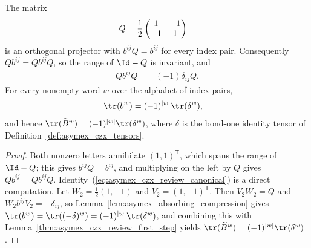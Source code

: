 \begin{lemma}
    \label{thm:asymex_czx_review_canonical_form}
    \leanok
    The matrix
    \begin{align}
        Q & =\frac12\begin{pmatrix}1&-1\\-1&1\end{pmatrix}
        \notag
    \end{align}
    is an orthogonal projector with $b^{ij}Q=b^{ij}$ for every index pair.
    Consequently $Qb^{ij}=Qb^{ij}Q$, so the range of $\Id-Q$ is invariant,
    and
    \begin{align}
        Qb^{ij}Q & =(-1)\delta_{ij}Q.
        \label{eq:asymex_czx_review_canonical}
    \end{align}
    For every nonempty word $w$ over the alphabet of index pairs,
    \begin{align}
        \tr(b^w) & =(-1)^{|w|}\tr(\delta^w),
        \notag
    \end{align}
    and hence $\tr(\widetilde B^w)=(-1)^{|w|}\tr(\delta^w)$, where $\delta$ is the
    bond-one identity tensor of Definition~\ref{def:asymex_czx_tensors}.
\end{lemma}

\begin{proof}
    \leanok
    Both nonzero letters annihilate $(1,1)^{\mathsf T}$, which spans the
    range of $\Id-Q$; this gives $b^{ij}Q=b^{ij}$, and multiplying on the
    left by $Q$ gives $Qb^{ij}=Qb^{ij}Q$.
    Identity~(\ref{eq:asymex_czx_review_canonical}) is a direct
    computation. Let $W_2=\tfrac12(1,-1)$ and $V_2=(1,-1)^{\mathsf T}$.
    Then $V_2W_2=Q$ and $W_2b^{ij}V_2=-\delta_{ij}$, so
    Lemma~\ref{lem:asymex_absorbing_compression} gives
    $\tr(b^w)=\tr((-\delta)^w)=(-1)^{|w|}\tr(\delta^w)$, and combining
    this with Lemma~\ref{thm:asymex_czx_review_first_step} yields
    $\tr(\widetilde B^w)=(-1)^{|w|}\tr(\delta^w)$.
\end{proof}

